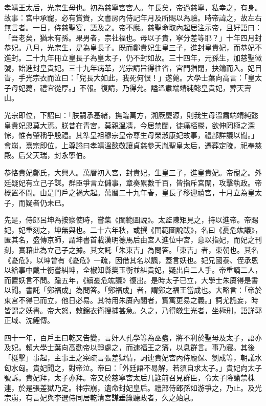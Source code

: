 孝靖王太后，光宗生母也。初為慈寧宮宮人。年長矣，帝過慈寧，私幸之，有身。故事：宮中承寵，必有賞賚，文書房內侍記年月及所賜以為驗。時帝諱之，故左右無言者。一日，侍慈聖宴，語及之。帝不應。慈聖命取內起居注示帝，且好語曰：「吾老矣，猶未有孫。果男者，宗社福也。母以子貴，寧分差等耶？」十年四月封恭妃。八月，光宗生，是為皇長子。既而鄭貴妃生皇三子，進封皇貴妃，而恭妃不進封。二十九年冊立皇長子為皇太子，仍不封如故。三十四年，元孫生，加慈聖徽號，始進封皇貴妃。三十九年病革，光宗請旨得往省，宮門猶閉，抉鑰而入。妃目眚，手光宗衣而泣曰：「兒長大如此，我死何恨！」遂薨。大學士葉向高言：「皇太子母妃薨，禮宜從厚。」不報。復請，乃得允。謚溫肅端靖純懿皇貴妃，葬天壽山。

光宗即位，下詔曰：「朕嗣承基緒，撫臨萬方，溯厥慶源，則我生母溫肅端靖純懿皇貴妃恩莫大焉。朕昔在青宮，莫親溫凊，今居禁闥，徒痛桮棬，欲伸罔極之深悰，惟有肇稱乎殷禮。其準皇祖穆宗皇帝尊生母榮淑康妃故事，禮部詳議以聞。」會崩，熹宗即位，上尊謚曰孝靖溫懿敬讓貞慈參天胤聖皇太后，遷葬定陵，祀奉慈殿。后父天瑞，封永寧伯。

恭恪貴妃鄭氏，大興人。萬曆初入宮，封貴妃，生皇三子，進皇貴妃。帝寵之。外廷疑妃有立己子謀。群臣爭言立儲事，章奏累數千百，皆指斥宮闈，攻擊執政。帝概置不問。由是門戶之禍大起。萬曆二十九年春，皇長子移迎禧宮，十月立為皇太子，而疑者仍未已。

先是，侍郎呂坤為按察使時，嘗集《閨範圖說》。太監陳矩見之，持以進帝。帝賜妃，妃重刻之，坤無與也。二十六年秋，或撰《閨範圖說跋》，名曰《憂危竑議》，匿其名，盛傳京師，謂坤書首載漢明德馬后由宮人進位中宮，意以指妃，而妃之刊刻，實藉此為立己子之據。其文託「朱東吉」為問答。「東吉」者，東朝也。其名《憂危》，以坤曾有《憂危》一疏，因借其名以諷，蓋言妖也。妃兄國泰、侄承恩以給事中戴士衡嘗糾坤，全椒知縣樊玉衡並糾貴妃，疑出自二人手。帝重謫二人，而置妖言不問。踰五年，《續憂危竑議》復出。是時太子已立，大學士朱賡得是書以聞。書託「鄭福成」為問答。「鄭福成」者，謂鄭之福王當成也。大略言：「帝於東宮不得已而立，他日必易。其特用朱賡內閣者，實寓更易之義。」詞尤詭妄，時皆謂之妖書。帝大怒，敕錦衣衛搜捕甚急。久之，乃得皦生光者，坐極刑，語詳郭正域、沈鯉傳。

四十一年，百戶王曰乾又告變，言奸人孔學等為巫蠱，將不利於聖母及太子，語亦及妃。賴大學士葉向高勸帝以靜處之，而速福王之籓，以息群言。事乃寢。其後「梃擊」事起，主事王之寀疏言張差獄情，詞連貴妃宮內侍龐保、劉成等，朝議水匈水匈。貴妃聞之，對帝泣。帝曰：「外廷語不易解，若須自求太子。」貴妃向太子號訴。貴妃拜，太子亦拜。帝又於慈寧宮太后几筵前召見群臣，令太子降諭禁株連，於是張差獄乃定。神宗崩，遺命封妃皇后。禮部侍郎孫如游爭之，乃止。及光宗崩，有言妃與李選侍同居乾清宮謀垂簾聽政者，久之始息。

